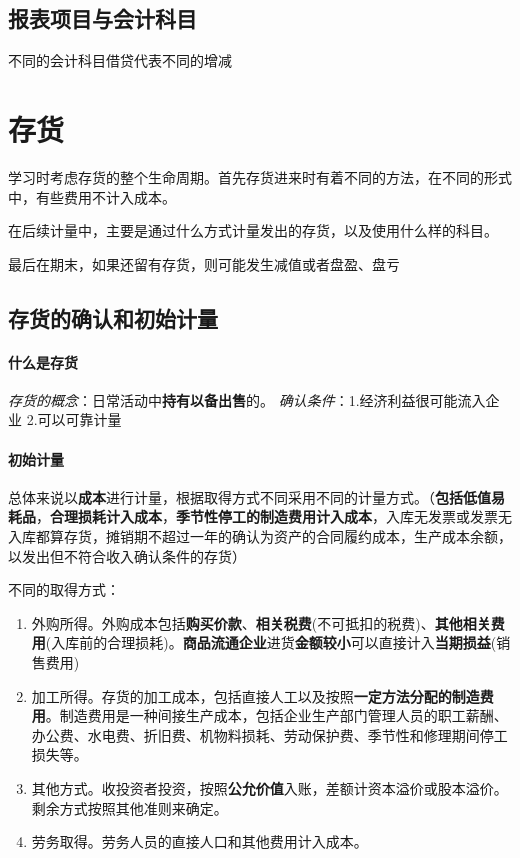 \documentclass[UTF8,12pt]{ctexart}
\numberwithin{equation}{section} %
\numberwithin{figure}{section}
\numberwithin{table}{section}
\begin{document}
	\subsection{报表项目与会计科目}
	不同的会计科目借贷代表不同的增减
	
	
	\newpage
	
	\section{存货}
	学习时考虑存货的整个生命周期。首先存货进来时有着不同的方法，在不同的形式中，有些费用不计入成本。
	
	在后续计量中，主要是通过什么方式计量发出的存货，以及使用什么样的科目。
	
	最后在期末，如果还留有存货，则可能发生减值或者盘盈、盘亏
	\subsection{存货的确认和初始计量}
	\paragraph{什么是存货} 
	\textit{存货的概念}：日常活动中\textbf{持有以备出售}的。 
	\textit{确认条件}：1.经济利益很可能流入企业 2.可以可靠计量
	
	\paragraph{初始计量}
	总体来说以\textbf{成本}进行计量，根据取得方式不同采用不同的计量方式。（\textbf{包括低值易耗品}，\textbf{合理损耗计入成本}，\textbf{季节性停工的制造费用计入成本}，入库无发票或发票无入库都算存货，摊销期不超过一年的确认为资产的合同履约成本，生产成本余额，以发出但不符合收入确认条件的存货）
	
	不同的取得方式：
	\begin{enumerate}
		\item 外购所得。外购成本包括\textbf{购买价款}、\textbf{相关税费}(不可抵扣的税费)、\textbf{其他相关费用}(入库前的合理损耗)。\textbf{商品流通企业}进货\textbf{金额较小}可以直接计入\textbf{当期损益}(销售费用)
		
		\item 加工所得。存货的加工成本，包括直接人工以及按照\textbf{一定方法分配的制造费用}。制造费用是一种间接生产成本，包括企业生产部门管理人员的职工薪酬、办公费、水电费、折旧费、机物料损耗、劳动保护费、季节性和修理期间停工损失等。
		
		\item 其他方式。收投资者投资，按照\textbf{公允价值}入账，差额计资本溢价或股本溢价。剩余方式按照其他准则来确定。
		
		\item 劳务取得。劳务人员的直接人口和其他费用计入成本。
	\end{enumerate}
	
\end{document}
